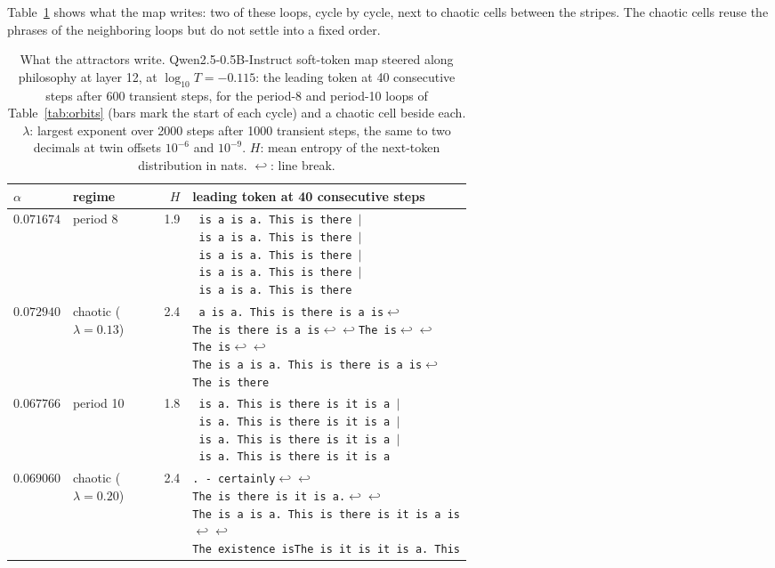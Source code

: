 \documentclass[11pt,letterpaper]{article}
\begin{document}
Table~\ref{tab:transcripts} shows what the map writes: two of these loops, cycle by cycle, next to chaotic cells
between the stripes. The chaotic cells reuse the phrases of the neighboring loops but do not settle into a fixed
order.
\begin{table}[H]
\centering\small
\begin{tabular}{@{}l l r p{0.6\linewidth}@{}}
\toprule
$\alpha$ & regime & $H$ & leading token at 40 consecutive steps \\
\midrule
$0.071674$ & period 8 & 1.9 & \texttt{\ is\ a\ is\ a.\ This\ is\ there\,$\mid$\,\ is\ a\ is\ a.\ This\ is\ there\,$\mid$\,\ is\ a\ is\ a.\ This\ is\ there\,$\mid$\,\ is\ a\ is\ a.\ This\ is\ there\,$\mid$\,\ is\ a\ is\ a.\ This\ is\ there} \\
$0.072940$ & chaotic ($\lambda=0.13$) & 2.4 & \texttt{\ a\ is\ a.\ This\ is\ there\ is\ a\ is$\hookleftarrow$The\ is\ there\ is\ a\ is$\hookleftarrow$$\hookleftarrow$The\ is$\hookleftarrow$$\hookleftarrow$The\ is$\hookleftarrow$$\hookleftarrow$The\ is\ a\ is\ a.\ This\ is\ there\ is\ a\ is$\hookleftarrow$The\ is\ there} \\
\midrule
$0.067766$ & period 10 & 1.8 & \texttt{\ is\ a.\ This\ is\ there\ is\ it\ is\ a\,$\mid$\,\ is\ a.\ This\ is\ there\ is\ it\ is\ a\,$\mid$\,\ is\ a.\ This\ is\ there\ is\ it\ is\ a\,$\mid$\,\ is\ a.\ This\ is\ there\ is\ it\ is\ a} \\
$0.069060$ & chaotic ($\lambda=0.20$) & 2.4 & \texttt{.\ -\ certainly$\hookleftarrow$$\hookleftarrow$The\ is\ there\ is\ it\ is\ a.$\hookleftarrow$$\hookleftarrow$The\ is\ a\ is\ a.\ This\ is\ there\ is\ it\ is\ a\ is$\hookleftarrow$$\hookleftarrow$The\ existence\ isThe\ is\ it\ is\ it\ is\ a.\ This} \\
\bottomrule
\end{tabular}
\caption{What the attractors write. Qwen2.5-0.5B-Instruct soft-token map steered along philosophy at layer 12, at
$\log_{10}T=-0.115$: the leading token at 40 consecutive steps after 600 transient steps, for the period-8 and
period-10 loops of Table~\ref{tab:orbits} (bars mark the start of each cycle) and a chaotic cell beside each.
$\lambda$: largest exponent over 2000 steps after 1000 transient steps, the same to two decimals at twin offsets
$10^{-6}$ and $10^{-9}$. $H$: mean entropy of the next-token distribution in nats. $\hookleftarrow$: line break.}
\label{tab:transcripts}
\end{table}
\end{document}
